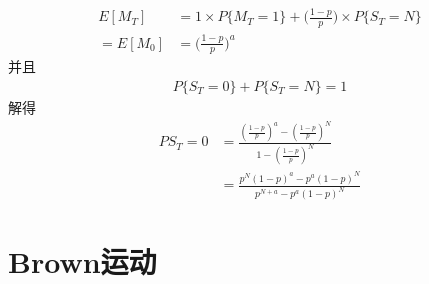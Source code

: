 \begin{enumerate}
\begin{enumerate}[\bfseries (1)]
\begin{align*}
			            E[M_T]  & =1\times P\{M_T=1\}+\bigg(\frac{1-p}{p} \bigg)\times P\{S_T=N\} \\
			            =E[M_0] & =\bigg(\frac{1-p}{p}\bigg)^a
		            \end{align*}
		            并且\begin{align*}
			            P\{S_T=0\}+P\{S_T=N\}=1
		            \end{align*}
		            解得
		            \begin{align*}
			            P{S_T=0}
			             & =\frac{(\frac{1-p}{p})^a-(\frac{1-p}{p})^N}{1-(\frac{1-p}{p})^N} \\
			             & =\frac{p^N(1-p)^a-p^a(1-p)^N}{p^{N+a}-p^a(1-p)^N}
		            \end{align*}
	      \end{enumerate}
\end{enumerate}


\section{Brown运动}

